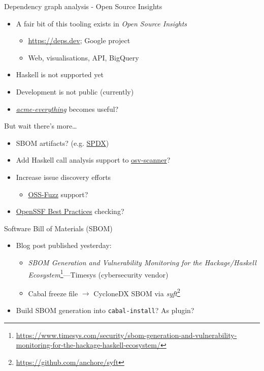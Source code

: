 \documentclass[ignorenonframetext,aspectratio=169,12pt]{beamer}
\begin{document}
\begin{frame}{Dependency graph analysis - Open Source Insights}
  \begin{itemize}
    \item A fair bit of this tooling exists in
      {\em Open Source Insights}
      \begin{itemize}
        \item \url{https://deps.dev}; Google project
        \item Web, visualisations, API, BigQuery
      \end{itemize}
    \item Haskell is not supported yet
    \item Development is not public (currently)
    \item \href{https://hackage.haskell.org/package/acme-everything}
      {\em acme-everything} becomes useful?
  \end{itemize}
\end{frame}

\begin{frame}{But wait there's more\ldots{}}
  \begin{itemize}
    \item SBOM artifacts? (e.g. \href{https://spdx.dev/}{SPDX})
    \item Add Haskell call analysis support to
      \href{https://google.github.io/osv-scanner}{osv-scanner}?
    \item Increase issue discovery efforts
      \begin{itemize}
        \item \href{https://github.com/google/oss-fuzz}{OSS-Fuzz} support?
      \end{itemize}
    \item \href{https://www.bestpractices.dev/en/criteria/0}{OpenSSF Best Practices} checking?
  \end{itemize}
\end{frame}

\begin{frame}{Software Bill of Materials (SBOM)}
  \begin{itemize}
    \item Blog post published yesterday:
      \begin{itemize}
        \item {\em SBOM Generation and Vulnerability Monitoring for
          the Hackage/Haskell Ecosystem}\footnote{\url{https://www.timesys.com/security/sbom-generation-and-vulnerability-monitoring-for-the-hackage-haskell-ecosystem/}}---Timesys (cybersecurity
          vendor)
        \item Cabal freeze file $\to$ CycloneDX SBOM via
          {\em syft}\footnote{\url{https://github.com/anchore/syft}}
      \end{itemize}
    \item Build SBOM generation into {\tt cabal-install}?  As
      plugin?
  \end{itemize}
\end{frame}
\end{document}
